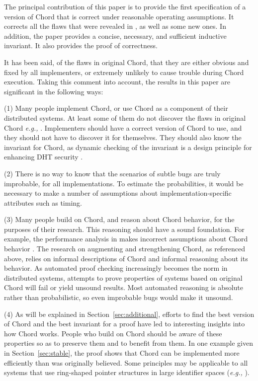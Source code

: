 \documentclass[conference]{IEEEtran}
\begin{document}
The principal contribution of this paper
is to provide the first specification of a
version of Chord that is correct under reasonable operating
assumptions.
It corrects all the flaws that were revealed in \cite{chord-ccr},
as well as some new ones.
In addition, the paper provides a concise, necessary, and sufficient
inductive invariant.
It also provides the proof of correctness.

It has been said, of the flaws in original Chord, that they are
either obvious and fixed by all implementers,
or extremely unlikely to cause trouble during Chord execution.
Taking this comment into account, 
the results in this paper are significant in the
following ways:

(1)
Many people implement Chord, or
use Chord as a component of their distributed systems.
At least some of them do not discover the flaws in original Chord 
{\it e.g.,} \cite{overlog}.
Implementers should have a correct version of Chord to use, and they
should not have to discover it for themselves.
They should also know the invariant for Chord, as dynamic checking
of the invariant is a
design principle for enhancing DHT security \cite{sitmorris}.

(2) There is no way to know that the scenarios of subtle bugs 
are truly improbable, for all implementations.
To estimate the probabilities, it would be necessary to make
a number of assumptions about implementation-specific attributes
such as timing.

(3)
Many people build on Chord, and reason about Chord behavior,
for the purposes of their research.
This reasoning should have a sound foundation. 
For example,
the performance analysis in \cite{chord-churn} makes incorrect
assumptions about Chord behavior \cite{chord-ccr}.
The research on augmenting and strengthening Chord, as referenced above,
relies on informal descriptions of Chord and informal reasoning about
its behavior.
As automated proof checking increasingly 
becomes the norm in distributed systems,
attempts to prove properties of systems based on original Chord
will fail or yield unsound results.
Most automated reasoning is absolute rather than probabilistic,
so even improbable bugs would make it unsound.

(4)
As will be explained in Section~\ref{sec:additional}, efforts to find the
best version of Chord and the best invariant for a proof have led to
interesting insights into how Chord works.
People who build on Chord should be aware of these properties so as to
preserve them and to benefit from them.
In one example given in Section~\ref{sec:stable}, the proof shows that
Chord can be implemented more efficiently than was originally believed.
Some principles may be applicable to all systems that use ring-shaped
pointer structures in large identifier spaces 
({\it e.g.,} \cite{awerbuch-hyperring,CAN}).
\end{document}
